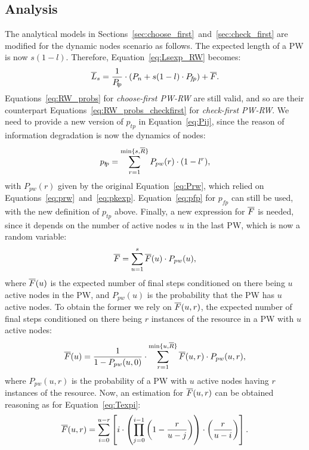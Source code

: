 \documentclass[]{elsarticle}
\newcommand{\s}		{\ensuremath{s}}		\newcommand{\sopt}	{\ensuremath{s_{opt}}}		\newcommand{\p}		{\ensuremath{p}}		\newcommand{\W}		{\ensuremath{W}}		\newcommand{\w}		{\ensuremath{w}}		\newcommand{\lsave}	{\ensuremath{\overline{l}_s}}	\newcommand{\lave}	{\ensuremath{\overline{l}}}	\newcommand{\lopt}	{\ensuremath{\overline{l}_{opt}}}
\newcommand{\pn} 	{\ensuremath{P_n}}
\newcommand{\ps} 	{\ensuremath{P_{\!t\!p}}}
\newcommand{\pf} 	{\ensuremath{P_{\!f\!p}}}
\newcommand{\ptp}       {\ensuremath{p_{t\!p}}}
\newcommand{\pfp}       {\ensuremath{p_{\!f\!p}}}
\newcommand{\PWx}[1]    {\ensuremath{P_{pw}(#1)}}
\begin{document}
\subsection{Analysis}


The analytical models in Sections~\ref{sec:choose_first}~and~\ref{sec:check_first} are modified for the dynamic nodes scenario as follows. 
The expected length of a PW is now $s(1-l)$. Therefore, Equation~\ref{eq:Lsexp_RW} becomes:
\begin{equation}
 \Lsexp = \frac{1}{\ps} \cdot (\pn + s(1-l)\cdot\pf) + \Texp.
 \label{eq:Lsexp_RW_dynnodes}
\end{equation}
Equations~\ref{eq:RW_probs} for \emph{choose-first PW-RW} are still valid, and so are their counterpart Equations~\ref{eq:RW_probs_checkfirst} for \emph{check-first PW-RW}. We need to provide a new version of $\ptp$ in Equation~\ref{eq:Pij}, since the reason of information degradation is now the dynamics of nodes:
\begin{equation}
 \ptp = \sum_{r=1}^{\mathrm{min}\{\s,\R\}} \PWx{r} \cdot (1-l^r),
 \label{eq:ptp_dynnodes}
\end{equation}
with $\PWx{r}$ given by the original Equation~\ref{eq:Prw}, which relied on Equations~\ref{eq:prw}~and~\ref{eq:pkexp}. Equation~\ref{eq:pfp} for $\pfp$ can still be used, with the new definition of $\ptp$ above.
Finally, a new expression for $\overline{F}$ is needed, since it depends on the number of active nodes $u$ in the last PW, which is now a random variable:
\begin{equation}
 \Texp = \sum_{u=1}^s \Texpi{u} \cdot \PWx{u}, 
 \label{eq:Texp_dynnodes}
\end{equation}
where $\overline{F}(u)$ is the expected number of final steps conditioned on there being $u$ active nodes in the PW, and $\PWx{u}$ is the probability that the PW has $u$ active nodes.
To obtain the former we rely on $\overline{F}(u,r)$, the expected number of final steps conditioned on there being $r$ instances of the resource in a PW with $u$ active nodes:
\begin{equation}
 \Texpi{u} = \frac{1}{1-\PWx{u,0}} \cdot \sum_{r=1}^{\mathrm{min}\{u,\R\}} \Texpi{u,r} \cdot \PWx{u,r}, 
 \label{eq:Texp_dynnodes2}
\end{equation}
where $\PWx{u,r}$ is the probability of a PW with $u$ active nodes having $r$ instances of the resource. Now, an estimation for $\overline{F}(u,r)$ can be obtained reasoning as for Equation~\ref{eq:Texpi}:
\begin{equation}
 \overline{F}(u,r) = \sum_{i=0}^{u-r} \left[ i \cdot \left( \prod_{j=0}^{i-1} \left( 1-\frac{r}{u-j} \right)  \right) \cdot \left(\frac{r}{u-i}\right) \right].
 \label{eq:Texpi_dynnodes}
\end{equation}
\end{document}
